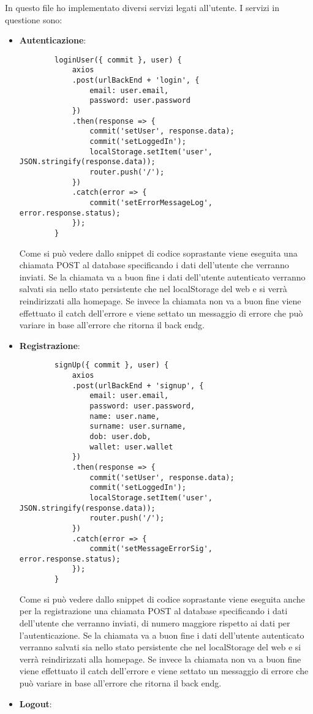 In questo file ho implementato diversi servizi legati all'utente. I servizi in questione sono:
\begin{itemize}
	\item \textbf{Autenticazione}:
	\begin{lstlisting}
		loginUser({ commit }, user) {
			axios
			.post(urlBackEnd + 'login', {
				email: user.email,
				password: user.password
			})
			.then(response => {
				commit('setUser', response.data);
				commit('setLoggedIn');
				localStorage.setItem('user', JSON.stringify(response.data));
				router.push('/');
			})
			.catch(error => {
				commit('setErrorMessageLog', error.response.status);
			});
		}
	\end{lstlisting}
	Come si può vedere dallo snippet di codice soprastante viene eseguita una chiamata POST al database specificando i dati dell'utente che verranno inviati. Se la chiamata va a buon fine i dati dell'utente autenticato verranno salvati sia nello stato persistente che nel localStorage del web e si verrà reindirizzati alla homepage. Se invece la chiamata non va a buon fine viene effettuato il catch dell'errore e viene settato un messaggio di errore che può variare in base all'errore che ritorna il \gls{back endg}.
	\item \textbf{Registrazione}:
	\begin{lstlisting}
		signUp({ commit }, user) {
			axios
			.post(urlBackEnd + 'signup', {
				email: user.email,
				password: user.password,
				name: user.name,
				surname: user.surname,
				dob: user.dob,
				wallet: user.wallet
			})
			.then(response => {
				commit('setUser', response.data);
				commit('setLoggedIn');
				localStorage.setItem('user', JSON.stringify(response.data));
				router.push('/');
			})
			.catch(error => {
				commit('setMessageErrorSig', error.response.status);
			});
		}
	\end{lstlisting}
	Come si può vedere dallo snippet di codice soprastante viene eseguita anche per la registrazione una chiamata POST al database specificando i dati dell'utente che verranno inviati, di numero maggiore rispetto ai dati per l'autenticazione. Se la chiamata va a buon fine i dati dell'utente autenticato verranno salvati sia nello stato persistente che nel localStorage del web e si verrà reindirizzati alla homepage. Se invece la chiamata non va a buon fine viene effettuato il catch dell'errore e viene settato un messaggio di errore che può variare in base all'errore che ritorna il \gls{back endg}.
	\item \textbf{Logout}:

\end{itemize}
